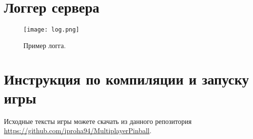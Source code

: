 \section{Логгер сервера}



\begin{figure}[h]
  \centering
  \texttt{[image: log.png]}
  \caption{Пример логга.}
  \label{image:servermenu}
\end{figure}

\section{Инструкция по компиляции и запуску игры}

Исходные тексты игры можете скачать из данного репозитория \href{https://github.com/iproha94/MultiplayerPinball}{https://github.com/iproha94/MultiplayerPinball}.

